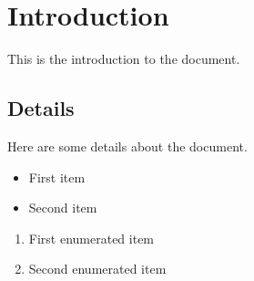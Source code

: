 \documentclass{article}
\begin{document}
\section{Introduction}
This is the introduction to the document.

\subsection{Details}
Here are some details about the document.

\begin{itemize}
    \item First item
    \item Second item
\end{itemize}

\begin{enumerate}
    \item First enumerated item
    \item Second enumerated item
\end{enumerate}
\end{document}
